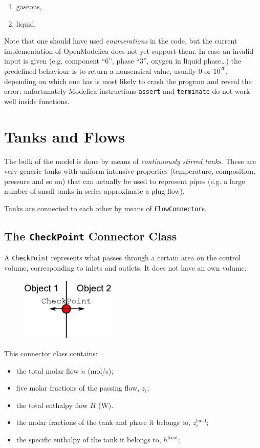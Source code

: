 \documentclass[a4paper]{article}
\begin{document}
\begin{enumerate}
\item gaseous,
\item liquid.
\end{enumerate}

Note that one should have used \emph{enumerations} in the code, but the current
implementation of OpenModelica does not yet support them. In case an invalid
input is given (e.g. component ``6'', phase ``3'', oxygen in liquid phase\ldots)
the predefined behaviour is to return a nonsensical value, usually 0 or
$10^{20}$, depending on which one has is most likely to crash the program and
reveal the error; unfortunately Modelica instructions \texttt{assert} and
\texttt{terminate} do not work well inside functions.

\section{Tanks and Flows}
The bulk of the model is done by means of \emph{continuously stirred tanks}.
These are very generic tanks with uniform intensive properties (temperature,
composition, pressure and so on) that can actually be used to represent pipes
(e.g. a large number of small tanks in series approximate a plug flow).

Tanks are connected to each other by means of \texttt{FlowConnector}s.


\subsection{The \texttt{CheckPoint} Connector Class}
A \texttt{CheckPoint} represents what passes through a certain area on the
control volume, corresponding to inlets and outlets. It does not have an own
volume.

\begin{figure}[h]
\centering
\includegraphics[width=0.4\textwidth]{pics/checkpoint}
\end{figure}

This connector class contains:

\begin{itemize}
\item the total molar flow $\dot n$ (mol/s);
\item five molar fractions of the passing flow, $z_i$;
\item the total enthalpy flow $\dot H$ (W).
\item the molar fractions of the tank and phase it belongs to,
$z^\text{local}_i$;
\item the specific enthalpy of the tank it belongs to, $h^\text{local}$;
\end{itemize}
\end{document}
